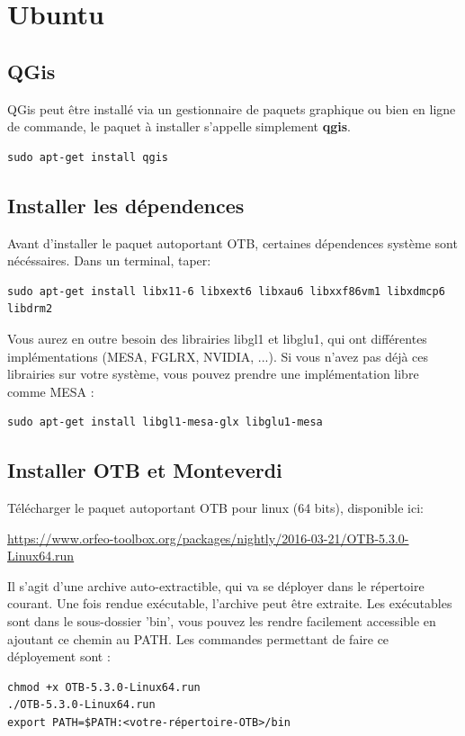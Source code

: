 \documentclass[10pt,a4paper]{article}
\begin{document}
\clearpage
\section{Ubuntu}

\subsection{QGis}
QGis peut être installé via un gestionnaire de paquets graphique ou bien en 
ligne de commande, le paquet à installer s'appelle simplement \textbf{qgis}.
\begin{verbatim}
sudo apt-get install qgis
\end{verbatim}

\subsection{Installer les dépendences}
Avant d'installer le paquet autoportant OTB, certaines dépendences système
sont nécéssaires. Dans un terminal, taper:
\begin{verbatim}
sudo apt-get install libx11-6 libxext6 libxau6 libxxf86vm1 libxdmcp6 libdrm2
\end{verbatim}

Vous aurez en outre besoin des librairies libgl1 et libglu1, qui ont 
différentes implémentations (MESA, FGLRX, NVIDIA, ...). Si vous n'avez pas 
déjà ces librairies sur votre système, vous pouvez prendre une implémentation
libre comme MESA :
\begin{verbatim}
sudo apt-get install libgl1-mesa-glx libglu1-mesa
\end{verbatim}

\subsection{Installer OTB et Monteverdi}
Télécharger le paquet autoportant OTB pour linux (64 bits), disponible ici:
\begin{center}
\url{https://www.orfeo-toolbox.org/packages/nightly/2016-03-21/OTB-5.3.0-Linux64.run}
\end{center}

Il s'agit d'une archive auto-extractible, qui va se déployer dans le répertoire
courant. Une fois rendue exécutable, l'archive peut être extraite. Les 
exécutables sont dans le sous-dossier 'bin', vous pouvez les rendre facilement
accessible en ajoutant ce chemin au PATH. Les commandes permettant de faire 
ce déployement sont :
\begin{verbatim}
chmod +x OTB-5.3.0-Linux64.run
./OTB-5.3.0-Linux64.run
export PATH=$PATH:<votre-répertoire-OTB>/bin
\end{verbatim}
\end{document}
